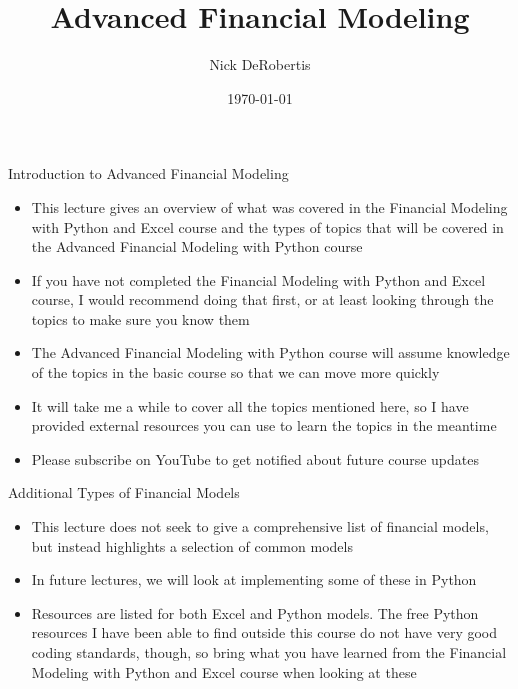 \documentclass[]{article}
\begin{document}
\title{Advanced Financial Modeling}
\author{Nick DeRobertis}
\date{\today}
\maketitle
\begin{section}{Introduction to Advanced Financial Modeling}
\begin{itemize}
\item This lecture gives an overview of what was covered in the Financial Modeling with Python and Excel course and the types of topics that will be covered in the Advanced Financial Modeling with Python course
\item If you have not completed the Financial Modeling with Python and Excel course, I would recommend doing that first, or at least looking through the topics to make sure you know them
\item The Advanced Financial Modeling with Python course will assume knowledge of the topics in the basic course so that we can move more quickly
\item It will take me a while to cover all the topics mentioned here, so I have provided external resources you can use to learn the topics in the meantime
\item Please subscribe on YouTube to get notified about future course updates
\end{itemize}
\end{section}
\begin{section}{Additional Types of Financial Models}
\begin{itemize}
\item This lecture does not seek to give a comprehensive list of financial models, but instead highlights a selection of common models
\item In future lectures, we will look at implementing some of these in Python
\item Resources are listed for both Excel and Python models. The free Python resources I have been able to find outside this course do not have very good coding standards, though, so bring what you have learned from the Financial Modeling with Python and Excel course when looking at these
\end{itemize}
\end{section}
\end{document}
